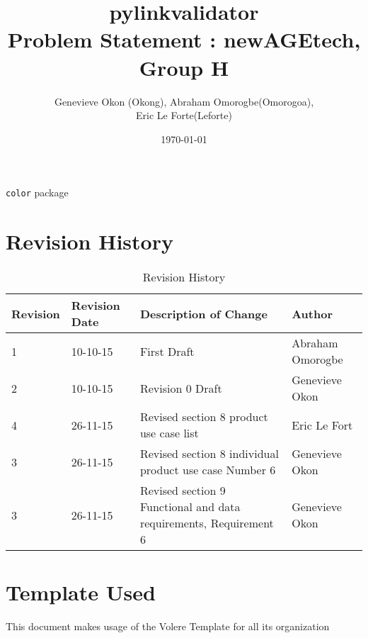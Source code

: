 \documentclass[titlepage]{article}
\begin{document}
\title{pylinkvalidator \\
 Problem Statement : newAGEtech, Group H }
\author{Genevieve Okon (Okong), Abraham Omorogbe(Omorogoa),\\
 Eric Le Forte(Leforte)}
\date{\today}
\maketitle

\texttt{color} package%
\tableofcontents
\listoffigures
\listoftables


\pagebreak


\section{Revision History}
\begin{table}[h!]
	\begin{tabular}{| p{5cm} | p{5cm} | p{5cm} |p{5cm} |}    \hline
Revision  &Revision Date &Description of Change &Author\\ \hline
1& 10-10-15&First Draft&Abraham Omorogbe\\ \hline
2& 10-10-15& Revision 0 Draft&Genevieve Okon\\ \hline
4& 26-11-15& Revised section 8 product use case list &Eric Le Fort\\ \hline
3& 26-11-15& Revised section 8 individual product use case Number 6&Genevieve Okon\\ \hline
3& 26-11-15& Revised section 9 Functional and data requirements, Requirement 6&Genevieve Okon\\ \hline

       \end{tabular}
       
       \caption{Revision History}
       \label{table:Revision History}
\end{table}


\section *{Template Used}
This document makes usage of the Volere Template for all its organization
\end{document}
